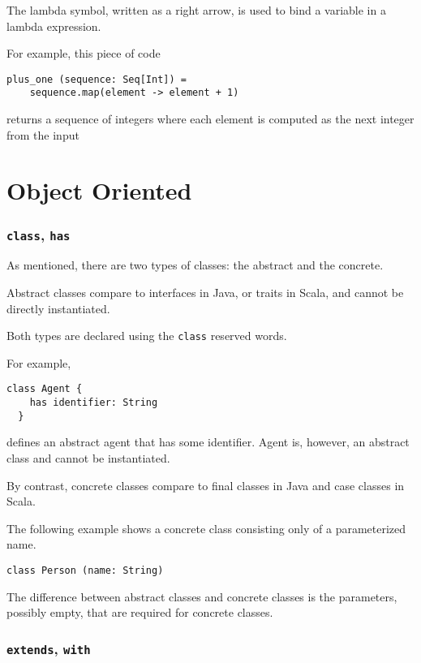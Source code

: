 \documentclass[12pt,a4paper]{book}
\newcommand{\srccode}[1]{\texttt{{#1}}}
\newcommand{\reservedWord}[1]{{\color{blue}\srccode{#1}}\xspace}
\newcommand{\sclass}{\reservedWord{class}}
\newcommand{\shas}{\reservedWord{has}}
\newcommand{\sextends}{\reservedWord{extends}}
\newcommand{\swith}{\reservedWord{with}}
\begin{document}
    The lambda symbol, written as a right arrow, is used to bind a variable in a lambda expression.

    For example, this piece of code
    \begin{lstlisting}[label={lst:exampleLambda}]
  plus_one (sequence: Seq[Int]) =
    sequence.map(element -> element + 1)
    \end{lstlisting}
    returns a sequence of integers where each element is computed as the next integer from the input


    \section{Object Oriented}

    \subsubsection{\sclass, \shas}

    As mentioned, there are two types of classes: the abstract and the concrete.

    Abstract classes compare to interfaces in Java, or traits in Scala, and cannot be directly instantiated.

    Both types are declared using the \sclass reserved words.

    For example,
    \begin{lstlisting}[label={lst:exampleAbstractClass}]
  class Agent {
    has identifier: String
  }
    \end{lstlisting}
    defines an abstract agent that has some identifier.
    Agent is, however, an abstract class and cannot be instantiated.

    By contrast, concrete classes compare to final classes in Java and case classes in Scala.

    The following example shows a concrete class consisting only of a parameterized name.
    \begin{lstlisting}[label={lst:exampleConcreteClass}]
  class Person (name: String)
    \end{lstlisting}

    The difference between abstract classes and concrete classes is the parameters, possibly empty, that are required for concrete classes.

    \subsubsection{\sextends, \swith}
\end{document}
